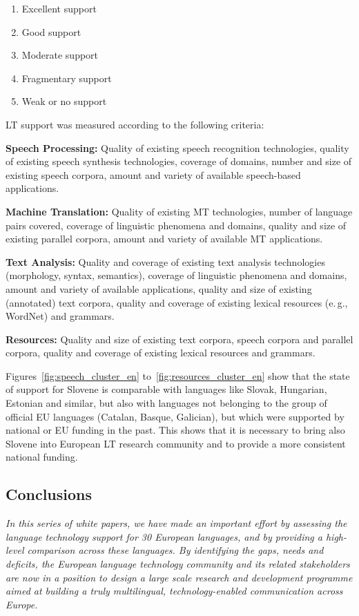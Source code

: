 \begin{multicols}{2}
\begin{enumerate}
\item Excellent support
\item Good support
\item Moderate support
\item Fragmentary support
\item Weak or no support
\end{enumerate}

LT support was measured according to the following criteria:

\textbf{Speech Processing:} Quality of existing speech recognition technologies, quality of existing speech synthesis technologies, coverage of domains, number and size of existing speech corpora, amount and variety of available speech-based applications.

\textbf{Machine Translation:} Quality of existing MT technologies, number of language pairs covered, coverage of linguistic phenomena and domains, quality and size of existing parallel corpora, amount and variety of available MT applications.

\textbf{Text Analysis:} Quality and coverage of existing text analysis technologies (morphology, syntax, semantics), coverage of linguistic phenomena and domains, amount and variety of available applications, quality and size of existing (annotated) text corpora, quality and coverage of existing lexical resources (e.\,g., WordNet) and grammars.

\textbf{Resources:} Quality and size of existing text corpora, speech corpora and parallel corpora, quality and coverage of existing lexical resources and grammars.

Figures~\ref{fig:speech_cluster_en} to~\ref{fig:resources_cluster_en} show that the state of support for Slovene is comparable with languages like Slovak, Hungarian, Estonian and similar, but also with languages not belonging to the group of official EU languages (Catalan, Basque, Galician), but which were supported by national or EU funding in the past. This shows that it is necessary to bring also Slovene into European LT research community and to provide a more consistent national funding.

\subsection{Conclusions}

\emph{In this series of white papers, we have made an important effort by assessing the language technology support for 30 European languages, and by providing a high-level comparison across these languages. By identifying the gaps, needs and deficits, the European language technology community and its related stakeholders are now in a position to design a large scale research and development programme aimed at building a truly multilingual, technology-enabled communication across Europe.}


\end{multicols}
